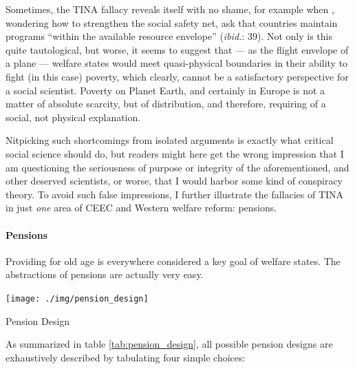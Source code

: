 \documentclass[11pt,a4paper,oneside,openright]{article}
\begin{document}
Sometimes, the TINA fallacy reveals itself with no shame, for example when \cite{Grow2005}, wondering how to strengthen the social safety net, ask that countries maintain programs ``within the available resource envelope'' (\emph{ibid.}: 39). 
Not only is this quite tautological, but worse, it seems to suggest that --- as the flight envelope of a plane --- welfare states would meet quasi-physical boundaries in their ability to fight (in this case) poverty, which clearly, cannot be a satisfactory perspective for a social scientist. 
Poverty on Planet Earth, and certainly in Europe is not a matter of absolute scarcity, but of distribution, and therefore, requiring of a social, not physical explanation.

Nitpicking such shortcomings from isolated arguments is exactly what critical social science should do, but readers might here get the wrong impression that I am questioning the seriousness of purpose or integrity of the aforementioned, and other deserved scientists, or worse, that I would harbor some kind of conspiracy theory. 
To avoid such false impressions, I further illustrate the fallacies of TINA in just \emph{one} area of \gls{CEEC} and Western welfare reform: 
pensions. 

\paragraph{Pensions}  \label{sec:pensions}
Providing for old age is everywhere considered a key goal of welfare states. 
The abstractions of pensions are actually very easy. 

 \begin{table}[htbp]
	\centering
	\texttt{[image: ./img/pension\_design]}  
	\caption{Pension Design}
	\label{tab:pension_design}
\end{table}%

As summarized in table \ref{tab:pension_design}, all possible pension designs are exhaustively described by tabulating four simple choices:
\end{document}
